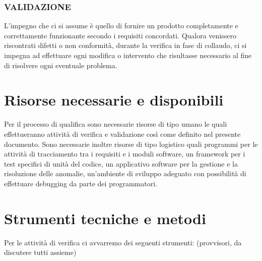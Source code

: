 \subsubsection*{VALIDAZIONE}

L'impegno che ci si assume \`e quello di fornire un prodotto completamente e
correttamente funzionante secondo i requisiti concordati. Qualora venissero
riscontrati difetti o non conformit\`a, durante la verifica in fase di collaudo,
ci si impegna ad effettuare ogni modifica o intervento che risultasse necessario
al fine di risolvere ogni eventuale problema.

\section{Risorse necessarie e disponibili}

Per il processo di qualifica sono necessarie risorse di tipo umano le quali
effettueranno attivit\`a di verifica e validazione cos\`i come definito nel
presente documento. Sono necessarie inoltre risorse di tipo logistico quali
programmi per le attivit\`a di tracciamento tra i requisiti e i moduli software,
un framework per i test specifici di unit\`a del codice, un applicativo software
per la gestione e la risoluzione delle anomalie, un'ambiente di sviluppo
adeguato con possibilit\`a di effettuare debugging da parte dei programmatori.
	
\section{Strumenti tecniche e metodi}

Per le attivit\`a di verifica ci avvarremo dei seguenti strumenti:
(provvisori, da discutere tutti assieme)

